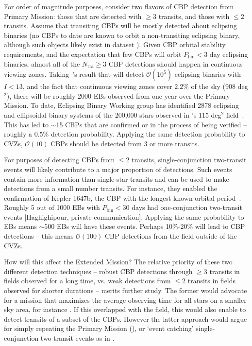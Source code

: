 \begin{enumerate}
	For order of magnitude purposes, consider two flavors of CBP detection from \tesss Primary Mission: those that are detected with $\ge3$ transits, and those with $\le 2$ transits.
	Assume that transiting CBPs will be mostly detected about eclipsing binaries (no CBPs to date are known to orbit a non-transiting eclipsing binary, although such objects likely exist in \keplers dataset \citep{martin_nontransiting_2014}).
	Given CBP orbital stability requirements, and the expectation that few CBPs will orbit $P_\mathrm{bin} < 3$ day eclipsing binaries, almost all of the $N_\mathrm{tra}\ge3$ CBP detections should happen in \tesss continuous viewing zones.
	Taking~'s result that \tess will detect $\mathcal{O}(10^5)$ eclipsing binaries with $I<13$, and the fact that \tesss continuous viewing zones cover $2.2\%$ of the sky (908 deg$^2$), there will be roughly $2000$ EBs observed from one year over the Primary Mission.
	To date, \keplers Eclipsing Binary Working group has identified 2878 eclipsing and ellipsoidal binary systems of the 200,000 stars observed in \kepler\!'s 115 deg$^2$ field~\citep{kirk_keplerEB_2016}.
	This has led to $\sim$15 CBPs that are confirmed or in the process of being verified -- roughly a $0.5\%$ detection probability.
	Applying the same detection probability to \tesss CVZs, $\mathcal{O}(10)$ CBPs should be detected from 3 or more transits.
	
	For purposes of detecting CBPs from $\le 2$ transits, single-conjunction two-transit events will likely contribute to a major proportion of \tesss detections.
	Such events contain more information than single-star transits and can be used to make detections from a small number transits. 
	For instance, they enabled the confirmation of Kepler 1647b, the CBP with the longest known orbital period~\citep{kostov_kep1647b_2015}.
	Roughly 5 out of 1000 \kepler EBs with $P_\mathrm{bin}<30$ days had one-conjunction two-transit events [Haghighipour, private communication].
	Applying the same probability to \tess EBs means $\sim500$ \tess EBs will have these events.
	Perhaps 10\%-20\% will lead to CBP detections -- this means $\mathcal{O}(100)$ CBP detections from the \tess field outside of the CVZs.
	
	How will this affect the Extended Mission?
	The relative priority of these two different detection techniques -- robust CBP detections through $\ge 3$ transits in fields observed for a long time, vs. weak detections from $\le 2$ transits in fields observed for shorter durations -- merits further study.
	The former would advocate for a mission that maximizes the average observing time for all stars on a smaller sky area, for instance \npole.
	If this overlapped with the \kepler field, this would also enable \tess to detect transits of a subset of the \kepler CBPs.
	However the latter approach would argue for simply repeating the Primary Mission (\nhemi), or `event catching' single-conjunction two-transit events as in \hemis.
	

\end{enumerate}

